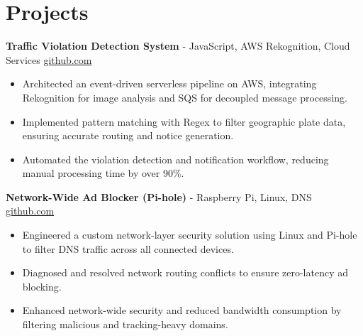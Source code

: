 \documentclass[11pt]{article}       %
\begin{document}

\vspace{-18.5pt}

\section*{Projects}

\textbf{Traffic Violation Detection System}{ - JavaScript, AWS Rekognition, Cloud Services} \hfill \href{https://github.com/Monica20030707/AWS_rekonigition-N-read-database}{github.com} \\
\vspace{-9pt}
\begin{itemize}
  \item Architected an event-driven serverless pipeline on AWS, integrating Rekognition for image analysis and SQS for decoupled message processing.
  \item Implemented pattern matching with Regex to filter geographic plate data, ensuring accurate routing and notice generation.
  \item Automated the violation detection and notification workflow, reducing manual processing time by over 90\%.
\end{itemize}

\textbf{Network-Wide Ad Blocker (Pi-hole)}{ - Raspberry Pi, Linux, DNS} \hfill \href{https://github.com/Monica20030707}{github.com} \\
\vspace{-9pt}
\begin{itemize}
  \item Engineered a custom network-layer security solution using Linux and Pi-hole to filter DNS traffic across all connected devices.
  \item Diagnosed and resolved network routing conflicts to ensure zero-latency ad blocking.
  \item Enhanced network-wide security and reduced bandwidth consumption by filtering malicious and tracking-heavy domains.
\end{itemize}
\end{document}
